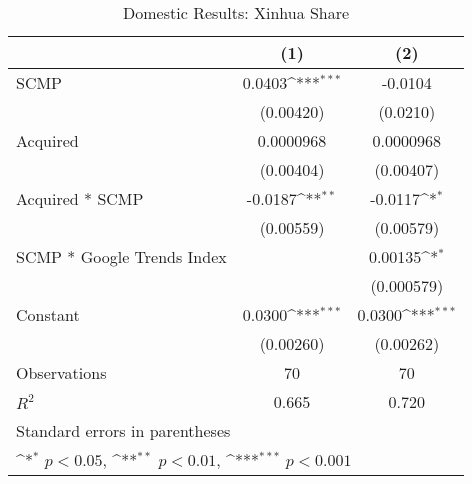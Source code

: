 \begin{table}[htbp]\centering
\def\sym#1{\ifmmode^{#1}\else\(^{#1}\)\fi}
\caption{Domestic Results: Xinhua Share\label{xhdomestic}}
\begin{tabular*}{0.75\textwidth}{@{\hskip\tabcolsep\extracolsep\fill}l*{2}{c}}
\hline\hline
                &\multicolumn{1}{c}{(1)}         &\multicolumn{1}{c}{(2)}         \\
\hline
SCMP            &   0.0403\sym{***}&  -0.0104         \\
                &(0.00420)         & (0.0210)         \\
[1em]
Acquired        &0.0000968         &0.0000968         \\
                &(0.00404)         &(0.00407)         \\
[1em]
Acquired * SCMP &  -0.0187\sym{**} &  -0.0117\sym{*}  \\
                &(0.00559)         &(0.00579)         \\
[1em]
SCMP * Google Trends Index&                  &  0.00135\sym{*}  \\
                &                  &(0.000579)         \\
[1em]
Constant        &   0.0300\sym{***}&   0.0300\sym{***}\\
                &(0.00260)         &(0.00262)         \\
\hline
Observations    &       70         &       70         \\
\(R^{2}\)       &    0.665         &    0.720         \\
\hline\hline
\multicolumn{3}{l}{\footnotesize Standard errors in parentheses}\\
\multicolumn{3}{l}{\footnotesize \sym{*} \(p<0.05\), \sym{**} \(p<0.01\), \sym{***} \(p<0.001\)}\\
\end{tabular*}
\end{table}
